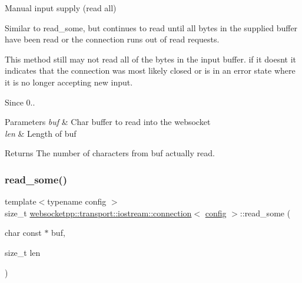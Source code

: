 Manual input supply (read all) 

Similar to read\+\_\+some, but continues to read until all bytes in the supplied buffer have been read or the connection runs out of read requests.

This method still may not read all of the bytes in the input buffer. if it doesn\textquotesingle{}t it indicates that the connection was most likely closed or is in an error state where it is no longer accepting new input.

\begin{DoxySince}{Since}
0..
\end{DoxySince}

\begin{DoxyParams}{Parameters}
{\em buf} & Char buffer to read into the websocket \\
\hline
{\em len} & Length of buf \\
\hline
\end{DoxyParams}
\begin{DoxyReturn}{Returns}
The number of characters from buf actually read. 
\end{DoxyReturn}
\mbox{\label{classwebsocketpp_1_1transport_1_1iostream_1_1connection_a4616555cbee050aec84da1e39a3c34a8}} 
\subsubsection{\texorpdfstring{read\+\_\+some()}{read\_some()}}
{\footnotesize\ttfamily template$<$typename config $>$ \\
size\+\_\+t \mbox{\hyperlink{classwebsocketpp_1_1transport_1_1iostream_1_1connection}{websocketpp\+::transport\+::iostream\+::connection}}$<$ \mbox{\hyperlink{classconfig}{config}} $>$\+::read\+\_\+some (\begin{DoxyParamCaption}\item[{char const $\ast$}]{buf,  }\item[{size\+\_\+t}]{len }\end{DoxyParamCaption})\hspace{0.3cm}{\ttfamily [inline]}}



